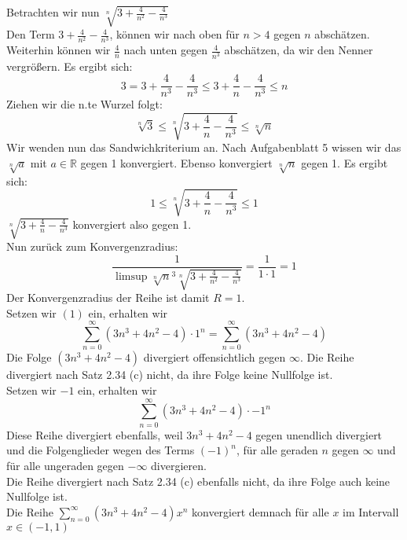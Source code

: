 \documentclass{article}
\begin{document}
\begin{enumerate}[ label= (\alph*) ]
        Betrachten wir nun \(\sqrt[n]{3 + \frac{4}{n^2} - \frac{4}{n^3}}\) \\
        Den Term \(3 + \frac{4}{n^2} - \frac{4}{n^3}\), können wir nach oben für \(n > 4\) gegen \(n\)
        abschätzen. Weiterhin können wir \(\frac{4}{n}\) nach unten gegen \(\frac{4}{n^3}\) abschätzen, da wir den Nenner vergrößern.
        Es ergibt sich:
        \[
            3 = 3 + \frac{4}{n^3} - \frac{4}{n^3} \leq 3 + \frac{4}{n} - \frac{4}{n^3} \leq n  
        \]
        Ziehen wir die n.te Wurzel folgt:
        \[
            \sqrt[n]{3} \leq \sqrt[n]{3 + \frac{4}{n} - \frac{4}{n^3}} \leq \sqrt[n]{n}
        \]
        Wir wenden nun das Sandwichkriterium an. Nach Aufgabenblatt 5 wissen wir das \(\sqrt[n]{a}\) mit \(a \in \mathbb{R}\) gegen 1 konvergiert.
        Ebenso konvergiert \(\sqrt[n]{n}\) gegen 1. Es ergibt sich:
        \[
            1 \leq \sqrt[n]{3 + \frac{4}{n} - \frac{4}{n^3}} \leq 1
        \]
        \(\sqrt[n]{3 + \frac{4}{n} - \frac{4}{n^3}}\) konvergiert also gegen 1. \\
        Nun zurück zum Konvergenzradius:
        \[
            \frac{1}{ \limsup {\sqrt[n]{n}}^3 \sqrt[n]{3 + \frac{4}{n^2} - \frac{4}{n^3}} } = \frac{1}{1 \cdot 1} = 1
        \]
        Der Konvergenzradius der Reihe ist damit \(R = 1\). \\
        Setzen wir \((1)\) ein, erhalten wir
        \[ \sum_{n=0}^{\infty} (3n^3 + 4n^2 -4) \cdot 1^n  = \sum_{n=0}^{\infty} (3n^3 + 4n^2 -4) \]
        Die Folge \((3n^3 + 4n^2 -4)\) divergiert offensichtlich gegen \( \infty \). Die Reihe divergiert nach Satz 2.34 (c) nicht, da ihre Folge keine Nullfolge ist. \\
        Setzen wir \(-1\) ein, erhalten wir
        \[ \sum_{n=0}^{\infty} (3n^3 + 4n^2 -4) \cdot {-1}^n \]
        Diese Reihe divergiert ebenfalls, weil \(3n^3 + 4n^2 -4\) gegen unendlich divergiert 
        und die Folgenglieder wegen des Terms \({(-1)}^n\),
        für alle geraden \(n\) gegen \( \infty \) und für alle ungeraden gegen \( -\infty \) divergieren. \\
        Die Reihe divergiert nach Satz 2.34 (c) ebenfalls nicht, da ihre Folge auch keine Nullfolge ist. \\
        Die Reihe \( \sum_{n=0}^{\infty} (3n^3 + 4n^2 -4)x^n \) konvergiert demnach für alle \(x\) im Intervall \(x \in (-1, 1) \)
    \end{enumerate}
\end{document}
